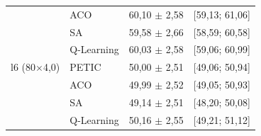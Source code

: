 \begin{table}[htb]
\begin{tabular}{llcc}
         & ACO & 60,10 $\pm$ 2,58 & [59,13; 61,06] \\
         & SA & 59,58 $\pm$ 2,66 & [58,59; 60,58] \\
         & Q-Learning & 60,03 $\pm$ 2,58 & [59,06; 60,99] \\
        \hline
        l6 (80$\times$4,0) & PETIC & 50,00 $\pm$ 2,51 & [49,06; 50,94] \\
         & ACO & 49,99 $\pm$ 2,52 & [49,05; 50,93] \\
         & SA & 49,14 $\pm$ 2,51 & [48,20; 50,08] \\
         & Q-Learning & 50,16 $\pm$ 2,55 & [49,21; 51,12] \\
        \hline
    \end{tabular}
\end{table}
